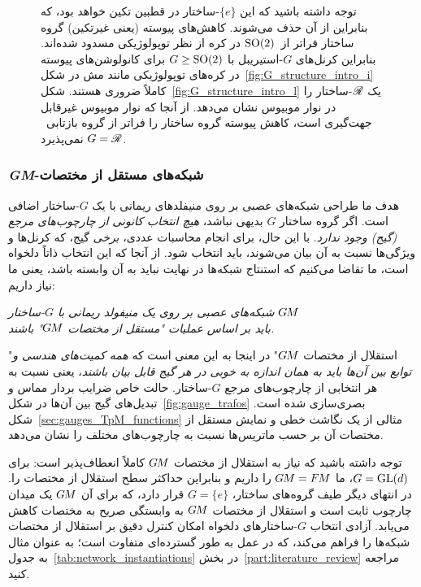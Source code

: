 {\begin{figure}
{			توجه داشته باشید که این $\{e\}$-ساختار در قطبین تکین خواهد بود، که بنابراین از آن حذف می‌شوند.
			کاهش‌های پیوسته (یعنی غیرتکین) گروه ساختار فراتر از~$\operatorname{SO}(2)$ در کره از نظر توپولوژیکی مسدود شده‌اند.
			بنابراین کرنل‌های $G$-استیریبل با $G\geq\operatorname{SO}(2)$ برای کانولوشن‌های پیوسته در کره‌های توپولوژیکی مانند مش در شکل~\ref{fig:G_structure_intro_i} کاملاً ضروری هستند.
			شکل~\ref{fig:G_structure_intro_l} یک $\mathscr{R}$-ساختار را در نوار موبیوس نشان می‌دهد.
			از آنجا که نوار موبیوس غیرقابل جهت‌گیری است، کاهش پیوسته گروه ساختار را فراتر از گروه بازتابی~$G=\mathscr{R}$ نمی‌پذیرد.
		}
		\label{fig:G_structures_intro}
	\end{figure}
	\thispagestyle{empty}
	\clearpage %
}


\subsubsection{\textit{GM}-شبکه‌های مستقل از مختصات}
هدف ما
طراحی شبکه‌های عصبی بر روی منیفلدهای ریمانی با یک $G$-ساختار اضافی است.
اگر گروه ساختار $G$ بدیهی نباشد، \emph{هیچ انتخاب کانونی از چارچوب‌های مرجع (گیج) وجود ندارد}.
با این حال، برای انجام محاسبات عددی، \emph{برخی} گیج، که کرنل‌ها و ویژگی‌ها نسبت به آن بیان می‌شوند، باید انتخاب شود.
از آنجا که این انتخاب ذاتاً دلخواه است، ما تقاضا می‌کنیم که استنتاج شبکه‌ها در نهایت نباید به آن وابسته باشد، یعنی ما نیاز داریم:
\begin{center}\it
	شبکه‌های عصبی بر روی یک منیفولد ریمانی با $G$-ساختار $G\mkern-1.4muM$ \\
	باید بر اساس عملیات "مستقل از مختصات $G\mkern-1.4muM$" باشند.
\end{center}
"استقلال از مختصات $G\mkern-1.4muM$" در اینجا به این معنی است که \emph{همه کمیت‌های هندسی و توابع بین آن‌ها باید به همان اندازه به خوبی در هر گیج قابل بیان باشند}، یعنی نسبت به هر انتخابی از چارچوب‌های مرجع $G$-ساختار.
حالت خاص ضرایب بردار مماس و تبدیل‌های گیج بین آن‌ها در شکل~\ref{fig:gauge_trafos} بصری‌سازی شده است.
شکل~\ref{sec:gauges_TpM_functions} مثالی از یک نگاشت خطی و نمایش مستقل از مختصات آن بر حسب ماتریس‌ها نسبت به چارچوب‌های مختلف را نشان می‌دهد.


توجه داشته باشید که نیاز به استقلال از مختصات $G\mkern-1.4muM$ کاملاً انعطاف‌پذیر است:
برای $G=\operatorname{GL}(d)$، ما $G\mkern-1.4muM=F\mkern-1.5muM$ را داریم و بنابراین حداکثر سطح استقلال از مختصات را.
در انتهای دیگر طیف گروه‌های ساختار، $G=\{e\}$ قرار دارد، که برای آن $G\mkern-1.4muM$ یک میدان چارچوب ثابت است و استقلال از مختصات $G\mkern-1.4muM$ به وابستگی صریح به مختصات کاهش می‌یابد.
آزادی انتخاب $G$-ساختارهای دلخواه امکان کنترل دقیق بر استقلال از مختصات شبکه‌ها را فراهم می‌کند،
که در عمل به طور گسترده‌ای متفاوت است؛ به عنوان مثال به جدول~\ref{tab:network_instantiations} در بخش~\ref{part:literature_review} مراجعه کنید.


